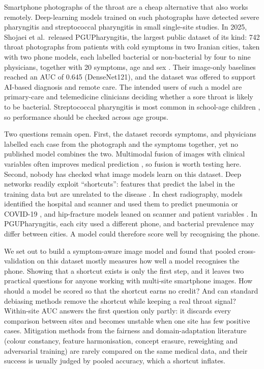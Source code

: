 \documentclass[preprint,12pt]{elsarticle}
\begin{document}
Smartphone photographs of the throat are a cheap alternative that also works remotely. Deep-learning models trained on such photographs have detected severe pharyngitis \cite{yoo2020pharyngitis} and streptococcal pharyngitis \cite{askarian2019strep} in small single-site studies. In 2025, Shojaei et al.\ released PGUPharyngitis, the largest public dataset of its kind: 742 throat photographs from patients with cold symptoms in two Iranian cities, taken with two phone models, each labelled bacterial or non-bacterial by four to nine physicians, together with 20 symptoms, age and sex \cite{shojaei2025pgu}. Their image-only baselines reached an AUC of 0.645 (DenseNet121), and the dataset was offered to support AI-based diagnosis and remote care. The intended users of such a model are primary-care and telemedicine clinicians deciding whether a sore throat is likely to be bacterial. Streptococcal pharyngitis is most common in school-age children \cite{shulman2012idsa}, so performance should be checked across age groups.

Two questions remain open. First, the dataset records symptoms, and physicians labelled each case from the photograph and the symptoms together, yet no published model combines the two. Multimodal fusion of images with clinical variables often improves medical prediction \cite{huang2020fusion}, so fusion is worth testing here. Second, nobody has checked what image models learn on this dataset. Deep networks readily exploit ``shortcuts'': features that predict the label in the training data but are unrelated to the disease \cite{geirhos2020shortcut}. In chest radiography, models identified the hospital and scanner and used them to predict pneumonia or COVID-19 \cite{zech2018pneumonia,degrave2021covid}, and hip-fracture models leaned on scanner and patient variables \cite{badgeley2019hip}. In PGUPharyngitis, each city used a different phone, and bacterial prevalence may differ between cities. A model could therefore score well by recognising the phone.

We set out to build a symptom-aware image model and found that pooled cross-validation on this dataset mostly measures how well a model recognises the phone. Showing that a shortcut exists is only the first step, and it leaves two practical questions for anyone working with multi-site smartphone images. How should a model be scored so that the shortcut earns no credit? And can standard debiasing methods remove the shortcut while keeping a real throat signal? Within-site AUC answers the first question only partly: it discards every comparison between sites and becomes unstable when one site has few positive cases. Mitigation methods from the fairness and domain-adaptation literature (colour constancy, feature harmonisation, concept erasure, reweighting and adversarial training) are rarely compared on the same medical data, and their success is usually judged by pooled accuracy, which a shortcut inflates.
\end{document}
